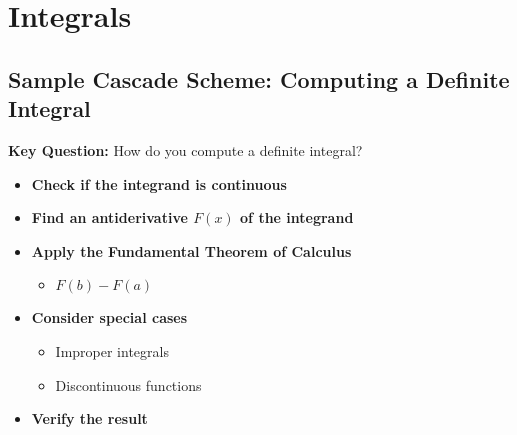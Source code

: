 \section{Integrals}

\subsection*{Sample Cascade Scheme: Computing a Definite Integral}

\begin{cascade}
	\textbf{Key Question:} How do you compute a definite integral?
	\begin{itemize}
		\item \textbf{Check if the integrand is continuous}
		\item \textbf{Find an antiderivative $F(x)$ of the integrand}
		\item \textbf{Apply the Fundamental Theorem of Calculus}
		      \begin{itemize}
			      \item $F(b) - F(a)$
		      \end{itemize}
		\item \textbf{Consider special cases}
		      \begin{itemize}
			      \item Improper integrals
			      \item Discontinuous functions
		      \end{itemize}
		\item \textbf{Verify the result}
	\end{itemize}
\end{cascade}


